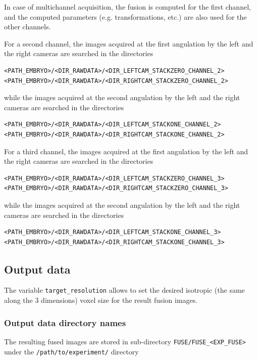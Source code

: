In case of multichannel acquisition, the fusion is computed for the
first channel, and the computed parameters (e.g. transformations,
etc.) are also used for the other channels. 

For a second channel, 
the images acquired at the first angulation by the
left and the right cameras are searched in the directories
\begin{verbatim}
<PATH_EMBRYO>/<DIR_RAWDATA>/<DIR_LEFTCAM_STACKZERO_CHANNEL_2>
<PATH_EMBRYO>/<DIR_RAWDATA>/<DIR_RIGHTCAM_STACKZERO_CHANNEL_2>
\end{verbatim}
while the images acquired at the second angulation by the
left and the right cameras are searched in the directories
\begin{verbatim}
<PATH_EMBRYO>/<DIR_RAWDATA>/<DIR_LEFTCAM_STACKONE_CHANNEL_2>
<PATH_EMBRYO>/<DIR_RAWDATA>/<DIR_RIGHTCAM_STACKONE_CHANNEL_2>
\end{verbatim}

For a third channel, 
the images acquired at the first angulation by the
left and the right cameras are searched in the directories
\begin{verbatim}
<PATH_EMBRYO>/<DIR_RAWDATA>/<DIR_LEFTCAM_STACKZERO_CHANNEL_3>
<PATH_EMBRYO>/<DIR_RAWDATA>/<DIR_RIGHTCAM_STACKZERO_CHANNEL_3>
\end{verbatim}
while the images acquired at the second angulation by the
left and the right cameras are searched in the directories
\begin{verbatim}
<PATH_EMBRYO>/<DIR_RAWDATA>/<DIR_LEFTCAM_STACKONE_CHANNEL_3>
<PATH_EMBRYO>/<DIR_RAWDATA>/<DIR_RIGHTCAM_STACKONE_CHANNEL_3>
\end{verbatim}



\subsection{Output data}
\label{sec:cli:fuse:output:data}

The variable \texttt{target\_resolution} allows to set the desired isotropic (the
same along the 3 dimensions) voxel size for the result fusion
images.

\subsubsection{Output data directory names}

The resulting fused images are stored in sub-directory
\texttt{FUSE/FUSE\_<EXP\_FUSE>} under the
\texttt{/path/to/experiment/} directory 

